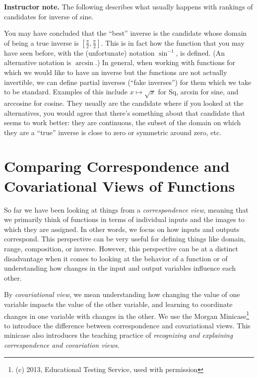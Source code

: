 \documentclass[11pt]{article}
\newcommand\smallnote[1]
	{\begin{mdframed}\raggedright  {\bf Instructor note.} {#1} \end{mdframed}}
\theoremstyle{definition}
\begin{document}
\smallnote{The following describes what usually happens with rankings of candidates for inverse of sine.}

You may have concluded that the ``best'' inverse is the candidate whose domain of being a true inverse is $[\frac{\pi}{2}, \frac{\pi}{2}]$. This is in fact how the function that you may have seen before, with the (unfortunate) notation $\sin^{-1}$, is defined. (An alternative notation is $\arcsin$.) In general, when working with functions for which we would like to have an inverse but the functions are not actually invertible, we can define partial inverses (``fake inverses'') for them which we take to be standard. Examples of this include $x\mapsto \sqrt{x}$ for Sq, arcsin for sine, and arccosine for cosine. They usually are the candidate where if you looked at the alternatives, you would agree that there's something about that candidate that seems to work better: they are continuous, the subset of the domain on which they are a ``true'' inverse is close to zero or symmetric around zero, etc.


\newpage 
\section{Comparing Correspondence and Covariational Views of Functions}

So far we have been looking at things from a {\it correspondence view}, meaning that we primarily think of functions in terms of individual inputs and the images to which they are assigned. In other words, we focus on how inputs and outputs correspond. This perspective can be very useful for defining things like domain, range, composition, or inverse. However, this perspective can be at a distinct disadvantage when it comes to looking at the behavior of a function or of understanding how changes in the input and output variables influence each other. 

By {\it covariational view}, we mean understanding how changing the value of one variable impacts the value of the other variable, and learning to coordinate changes in one variable with changes in the other. We use the Morgan Minicase\footnote{(c) 2013, Educational Testing Service, used with permission} to introduce the difference between correspondence and covariational views. This minicase also introduces the teaching practice of {\it recognizing and explaining correspondence and covariation views}.

\end{document}
